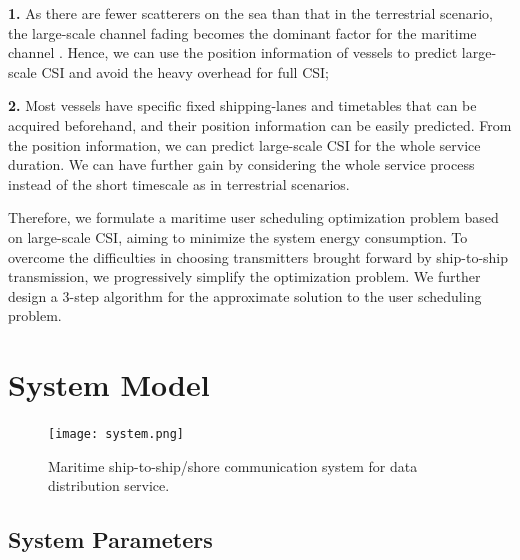 \documentclass[conference]{IEEEtran}
\begin{document}
 \textbf{1.} As there are fewer scatterers on the sea than that in the terrestrial scenario, the large-scale channel fading becomes the dominant factor for the maritime channel \cite{p403}. Hence, we can use the position information of vessels to predict large-scale CSI and avoid the heavy overhead for full CSI; 
 
 \textbf{2.} %
 Most vessels have specific fixed shipping-lanes and timetables that can be acquired beforehand, and their position information can be easily predicted. From the position information, we can predict large-scale CSI for the whole service duration. We can have further gain by considering the whole service process instead of the short timescale as in terrestrial scenarios. 
 
 Therefore, we formulate a maritime user scheduling optimization problem based on large-scale CSI, aiming to minimize the system energy consumption. %
 To overcome the difficulties in choosing transmitters brought forward by ship-to-ship transmission, we progressively simplify the optimization problem. We further design a 3-step algorithm for the approximate solution to the user scheduling problem. 
 
 \section{System Model}\label{sec:2}
 
 \begin{figure} [htb]
 \begin{center}
 \texttt{[image: system.png]}
 \end{center}
 \vspace*{-4mm} 
 \caption{Maritime ship-to-ship/shore communication system for data distribution service.}\label{fig:1}
 \vspace*{-4mm} 
 \end{figure}
 
 
 \subsection{System Parameters}
 
\end{document}

